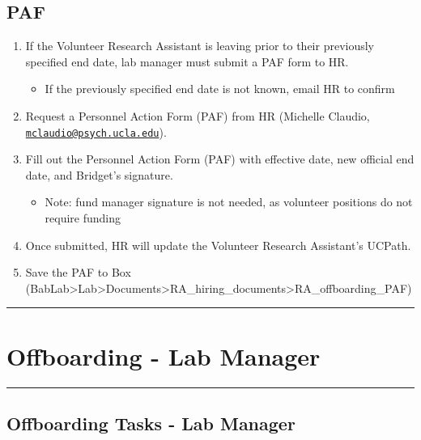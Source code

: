 \documentclass[
]{book}
\providecommand{\tightlist}{%
  \setlength{\itemsep}{0pt}\setlength{\parskip}{0pt}}
\begin{document}
\hypertarget{paf}{%
\subsection{PAF}\label{paf}}

\begin{enumerate}
\def\labelenumi{\arabic{enumi}.}
\tightlist
\item
  If the Volunteer Research Assistant is leaving prior to their previously specified end date, lab manager must submit a PAF form to HR.

  \begin{itemize}
  \tightlist
  \item
    If the previously specified end date is not known, email HR to confirm
  \end{itemize}
\item
  Request a Personnel Action Form (PAF) from HR (Michelle Claudio, \href{mailto:mclaudio@psych.ucla.edu}{\nolinkurl{mclaudio@psych.ucla.edu}}).
\item
  Fill out the Personnel Action Form (PAF) with effective date, new official end date, and Bridget's signature.

  \begin{itemize}
  \tightlist
  \item
    Note: fund manager signature is not needed, as volunteer positions do not require funding
  \end{itemize}
\item
  Once submitted, HR will update the Volunteer Research Assistant's UCPath.
\item
  Save the PAF to Box (BabLab\textgreater Lab\textgreater Documents\textgreater RA\_hiring\_documents\textgreater RA\_offboarding\_PAF)
\end{enumerate}

\begin{center}\rule{0.5\linewidth}{0.5pt}\end{center}

\hypertarget{offboarding---lab-manager}{%
\section{Offboarding - Lab Manager}\label{offboarding---lab-manager}}

\begin{center}\rule{0.5\linewidth}{0.5pt}\end{center}

\hypertarget{offboarding-tasks---lab-manager}{%
\subsection{Offboarding Tasks - Lab Manager}\label{offboarding-tasks---lab-manager}}
\end{document}
